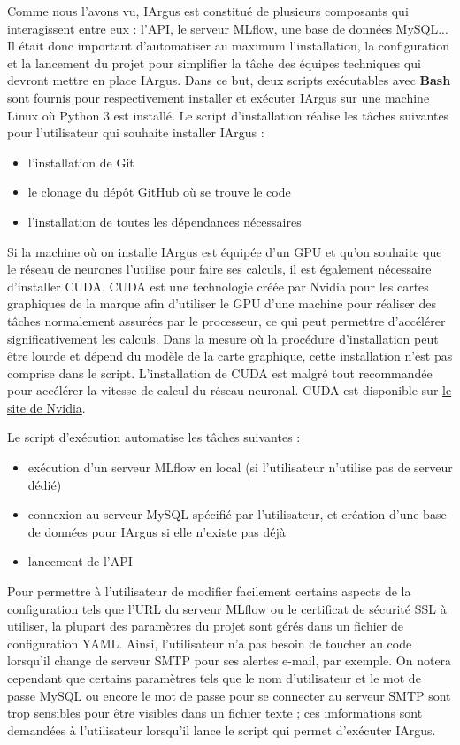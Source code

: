 \documentclass[french]{article}
\begin{document}
    Comme nous l'avons vu, IArgus est constitué de plusieurs composants qui interagissent entre eux : l'API, le serveur MLflow, une base de données MySQL... Il était donc important d'automatiser au maximum l'installation, la configuration et la lancement du projet pour simplifier la tâche des équipes techniques qui devront mettre en place IArgus. Dans ce but, deux scripts exécutables avec \textbf{Bash} sont fournis pour respectivement installer et exécuter IArgus sur une machine Linux où Python 3 est installé. Le script d'installation réalise les tâches suivantes pour l'utilisateur qui souhaite installer IArgus :
    \begin{itemize}
        \item l'installation de Git
        \item le clonage du dépôt GitHub où se trouve le code
        \item l'installation de toutes les dépendances nécessaires
    \end{itemize} 

    Si la machine où on installe IArgus est équipée d'un GPU et qu'on souhaite que le réseau de neurones l'utilise pour faire ses calculs, il est également nécessaire d'installer CUDA. CUDA est une technologie créée par Nvidia pour les cartes graphiques de la marque afin d'utiliser le GPU d'une machine pour réaliser des tâches normalement assurées par le processeur, ce qui peut permettre d'accélérer significativement les calculs. Dans la mesure où la procédure d'installation peut être lourde et dépend du modèle de la carte graphique, cette installation n'est pas comprise dans le script. L'installation de CUDA est malgré tout recommandée pour accélérer la vitesse de calcul du réseau neuronal. CUDA est disponible sur \href{https://developer.nvidia.com/cuda-downloads}{le site de Nvidia}.

    Le script d'exécution automatise les tâches suivantes :
    \begin{itemize}
        \item exécution d'un serveur MLflow en local (si l'utilisateur n'utilise pas de serveur dédié)
        \item connexion au serveur MySQL spécifié par l'utilisateur, et création d'une base de données pour IArgus si elle n'existe pas déjà
        \item lancement de l'API
    \end{itemize}

    Pour permettre à l'utilisateur de modifier facilement certains aspects de la configuration tels que l'URL du serveur MLflow ou le certificat de sécurité SSL à utiliser, la plupart des paramètres du projet sont gérés dans un fichier de configuration YAML. Ainsi, l'utilisateur n'a pas besoin de toucher au code lorsqu'il change de serveur SMTP pour ses alertes e-mail, par exemple. On notera cependant que certains paramètres tels que le nom d'utilisateur et le mot de passe MySQL ou encore le mot de passe pour se connecter au serveur SMTP sont trop sensibles pour être visibles dans un fichier texte ; ces imformations sont demandées à l'utilisateur lorsqu'il lance le script qui permet d'exécuter IArgus.
\end{document}
